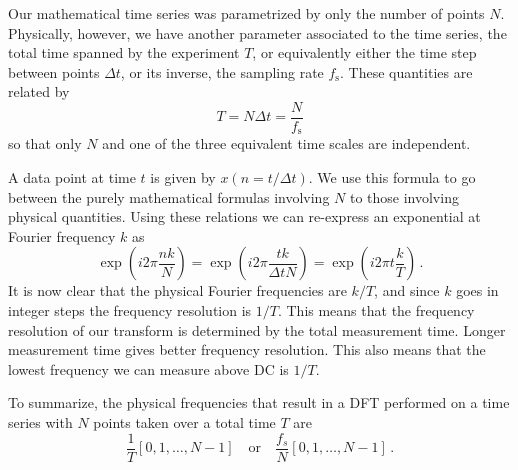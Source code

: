
Our mathematical time series was parametrized by only the number of points $N$. Physically, however, we have another parameter associated to the time series, the total time spanned by the experiment $T$, or equivalently either the time step between points $\Delta t$, or its inverse, the sampling rate $f_{\textrm{s}}$. These quantities are related by
\begin{displaymath}
  T = N\Delta t = \frac{N}{f_{\textrm{s}}}
\end{displaymath}
so that only $N$ and one of the three equivalent time scales are independent.

A data point at time $t$ is given by $x(n=t/\Delta t)$. We use this formula to go between the purely mathematical formulas involving $N$ to those involving physical quantities. Using these relations we can re-express an exponential at Fourier frequency $k$ as
\begin{displaymath}
  \exp \left(i2\pi\frac{nk}{N}\right)
  = \exp\left(i 2 \pi \frac{tk}{\Delta t N} \right)
  = \exp \left( i 2\pi t\frac{k}{T} \right)
  \, .
\end{displaymath}
It is now clear that the physical Fourier frequencies are $k/T$, and since $k$ goes in integer steps the frequency resolution is $1/T$.
This means that the frequency resolution of our transform is determined by the total measurement time.
Longer measurement time gives better frequency resolution.
This also means that the lowest frequency we can measure above DC is $1/T$.

To summarize, the physical frequencies that result in a DFT performed on a time series with $N$ points taken over a total time $T$ are
\begin{displaymath}
  \frac{1}{T}\left[0,1,\ldots,N-1\right]\quad\textrm{or}\quad\frac{f_{s}}{N}\left[0,1,\ldots,N-1\right]
  \, .
\end{displaymath}
